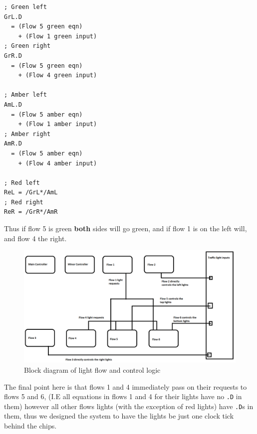 \begin{lstlisting}[basicstyle=\ttfamily]
; Green left
GrL.D
  = (Flow 5 green eqn)
    + (Flow 1 green input)
; Green right
GrR.D
  = (Flow 5 green eqn)
    + (Flow 4 green input)

; Amber left
AmL.D
  = (Flow 5 amber eqn)
    + (Flow 1 amber input)
; Amber right
AmR.D
  = (Flow 5 amber eqn)
    + (Flow 4 amber input)

; Red left
ReL = /GrL*/AmL
; Red right 
ReR = /GrR*/AmR
\end{lstlisting}
Thus if flow 5 is green \textbf{both} sides will go green, and if flow 1 is on
the left will, and flow 4 the right.

\begin{figure}
\includegraphics[width=\linewidth]{img/5Hvmk3.png}
\caption{Block diagram of light flow and control logic}
\label{fig:TL flows red}
\end{figure}

The final point here is that flows 1 and 4 immediately pass on their requests to
flows 5 and 6, (I.E all equations in flows 1 and 4 for their lights have no
\texttt{.D} in them) however all other flows lights (with the exception of red
lights) have \texttt{.D}s in them, thus we designed the system to have the
lights be just one clock tick behind the chips. 